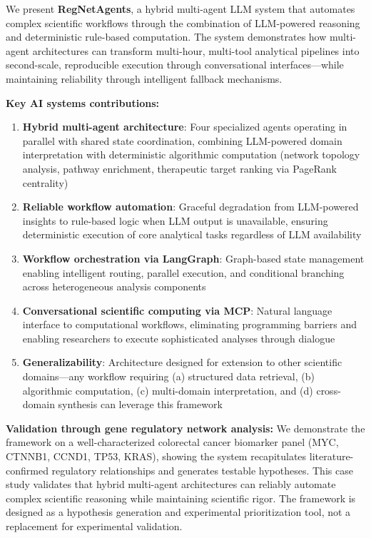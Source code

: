 \documentclass[11pt]{article}
\begin{document}
We present \textbf{RegNetAgents}, a hybrid multi-agent LLM system that automates complex scientific workflows through the combination of LLM-powered reasoning and deterministic rule-based computation. The system demonstrates how multi-agent architectures can transform multi-hour, multi-tool analytical pipelines into second-scale, reproducible execution through conversational interfaces---while maintaining reliability through intelligent fallback mechanisms.

\textbf{Key AI systems contributions:}

\begin{enumerate}
\item \textbf{Hybrid multi-agent architecture}: Four specialized agents operating in parallel with shared state coordination, combining LLM-powered domain interpretation with deterministic algorithmic computation (network topology analysis, pathway enrichment, therapeutic target ranking via PageRank centrality)

\item \textbf{Reliable workflow automation}: Graceful degradation from LLM-powered insights to rule-based logic when LLM output is unavailable, ensuring deterministic execution of core analytical tasks regardless of LLM availability

\item \textbf{Workflow orchestration via LangGraph}: Graph-based state management enabling intelligent routing, parallel execution, and conditional branching across heterogeneous analysis components

\item \textbf{Conversational scientific computing via MCP}: Natural language interface to computational workflows, eliminating programming barriers and enabling researchers to execute sophisticated analyses through dialogue

\item \textbf{Generalizability}: Architecture designed for extension to other scientific domains---any workflow requiring (a) structured data retrieval, (b) algorithmic computation, (c) multi-domain interpretation, and (d) cross-domain synthesis can leverage this framework
\end{enumerate}

\textbf{Validation through gene regulatory network analysis:} We demonstrate the framework on a well-characterized colorectal cancer biomarker panel (MYC, CTNNB1, CCND1, TP53, KRAS), showing the system recapitulates literature-confirmed regulatory relationships and generates testable hypotheses. This case study validates that hybrid multi-agent architectures can reliably automate complex scientific reasoning while maintaining scientific rigor. The framework is designed as a hypothesis generation and experimental prioritization tool, not a replacement for experimental validation.
\end{document}

